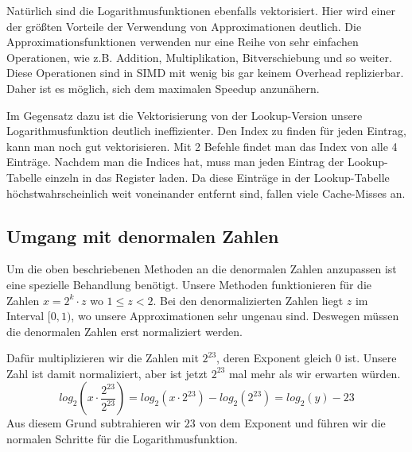Natürlich sind die Logarithmusfunktionen ebenfalls vektorisiert. Hier wird einer der größten Vorteile der Verwendung von Approximationen deutlich. Die Approximationsfunktionen verwenden nur eine Reihe von sehr einfachen Operationen, wie z.B. Addition, Multiplikation, Bitverschiebung und so weiter. Diese Operationen sind in SIMD mit wenig bis gar keinem Overhead replizierbar. Daher ist es möglich, sich dem maximalen Speedup anzunähern.

Im Gegensatz dazu ist die Vektorisierung von der Lookup-Version unsere Logarithmusfunktion deutlich ineffizienter. Den Index zu finden für jeden Eintrag, kann man noch gut vektorisieren. Mit 2 Befehle findet man das Index von alle 4 Einträge. Nachdem man die Indices hat, muss man jeden Eintrag der Lookup-Tabelle einzeln in das Register laden. Da diese Einträge in der Lookup-Tabelle höchstwahrscheinlich weit voneinander entfernt sind, fallen viele Cache-Misses an. 

\subsection{Umgang mit denormalen Zahlen}
Um die oben beschriebenen Methoden an die denormalen Zahlen anzupassen ist eine spezielle Behandlung benötigt. Unsere Methoden funktionieren für die Zahlen $x = 2^k \cdot z$ wo $1 \leq z < 2$. Bei den denormalizierten Zahlen liegt $z$ im Interval $[0,1)$, wo unsere Approximationen sehr ungenau sind. Deswegen müssen die denormalen Zahlen erst normaliziert werden. 

Dafür multiplizieren wir die Zahlen mit $2^{23}$, deren Exponent gleich $0$ ist. Unsere Zahl ist damit normaliziert, aber ist jetzt $2^{23}$ mal mehr als wir erwarten würden. \[log_2 \left(x \cdot  \frac{2^{23}}{2^{23}}\right)  = log_2(x\cdot 2^{23})-log_2(2^{23}) = log_2(y) - 23\]
Aus diesem Grund subtrahieren wir $23$ von dem Exponent und führen wir die normalen Schritte für die Logarithmusfunktion.



